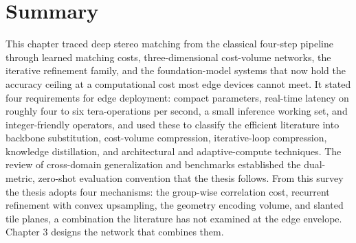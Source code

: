 \FloatBarrier
\section{Summary}
This chapter traced deep stereo matching from the classical
four-step pipeline through learned matching costs, three-dimensional
cost-volume networks, the iterative refinement family, and the
foundation-model systems that now hold the accuracy ceiling at a
computational cost most edge devices cannot meet. It stated four
requirements for edge deployment: compact parameters, real-time
latency on roughly four to six tera-operations per second, a small
inference working set, and integer-friendly operators, and used these
to classify the efficient literature into backbone substitution,
cost-volume compression, iterative-loop compression, knowledge
distillation, and architectural and adaptive-compute techniques. The
review of cross-domain generalization and benchmarks established the
dual-metric, zero-shot evaluation convention that the thesis follows.
From this survey the thesis adopts four mechanisms: the group-wise
correlation cost, recurrent refinement with convex upsampling, the
geometry encoding volume, and slanted tile planes, a combination the
literature has not examined at the edge envelope. Chapter 3 designs
the network that combines them.
